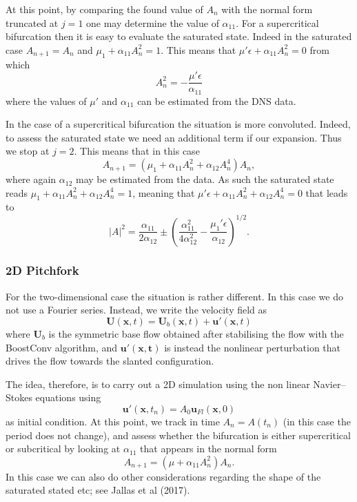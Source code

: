 At this point, by comparing the found value of $A_{n}$ with the normal form truncated at $j=1$ one may determine the value of $\alpha_{11}$. For a supercritical bifurcation then it is easy to evaluate the saturated state. Indeed in the saturated case $A_{n+1}=A_n$ and $\mu_1 + \alpha_{11}A_n^2 = 1$. This means that $\mu' \epsilon + \alpha_{11}A_n^2=0$ from which
%
\begin{equation}
  A_n^2 = - \frac{ \mu' \epsilon}{\alpha_{11}}
\end{equation}
%
where the values of $\mu'$ and $\alpha_{11}$ can be estimated from the DNS data.

In the case of a supercritical bifurcation the situation is more convoluted. Indeed, to assess the saturated state we need an additional term if our expansion. Thus we stop at $j=2$. This means that in this case
%
\begin{equation}
  A_{n+1} = \left( \mu_1 + \alpha_{11}A_n^2 + \alpha_{12} A_n^4 \right) A_n,
\end{equation}
%
where again $\alpha_{12}$ may be estimated from the data.
As such the saturated state reads $\mu_1 + \alpha_{11} A_n^2 + \alpha_{12} A_n^4 = 1$, meaning that $\mu' \epsilon + \alpha_{11} A_n^2 + \alpha_{12} A_n^4 = 0$ that leads to
%
\begin{equation}
  |A|^2 = \frac{\alpha_{11}}{2 \alpha_{12}} \pm \left( \frac{\alpha_{11}^2}{4 \alpha_{12}^2} - \frac{\mu_1' \epsilon}{\alpha_{12}} \right)^{1/2}.
\end{equation}

\subsubsection{2D Pitchfork}

For the two-dimensional case the situation is rather different. In this case we do not use a Fourier series. Instead, we write the velocity field as
%
\begin{equation}
\bm{U}(\bm{x},t) = \bm{U}_b(\bm{x},t) + \bm{u}'(\bm{x},t)
\end{equation}
%
where $\bm{U}_b$ is the symmetric base flow obtained after stabilising the flow with the BoostConv algorithm, and $\bm{u}'(\bm{x,t})$ is instead the nonlinear perturbation that drives the flow towards the slanted configuration.

The idea, therefore, is to carry out a 2D simulation using the non linear Navier--Stokes equations using
%
\begin{equation}
  \bm{u}'(\bm{x},t_n) = A_0 \bm{u}_{Fl}(\bm{x},0)
\end{equation}
%
as initial condition. At this point, we track in time $A_n=A(t_n)$ (in this case the period does not change), and assess whether the bifurcation is either supercritical or subcritical by looking at $\alpha_{11}$ that appears in the normal form
%
\begin{equation}
 A_{n+1} = \left( \mu + \alpha_{11} A_n^2 \right) A_n.
\end{equation}
%
In this case we can also do other considerations regarding the shape of the saturated stated etc; see Jallas et al (2017).


